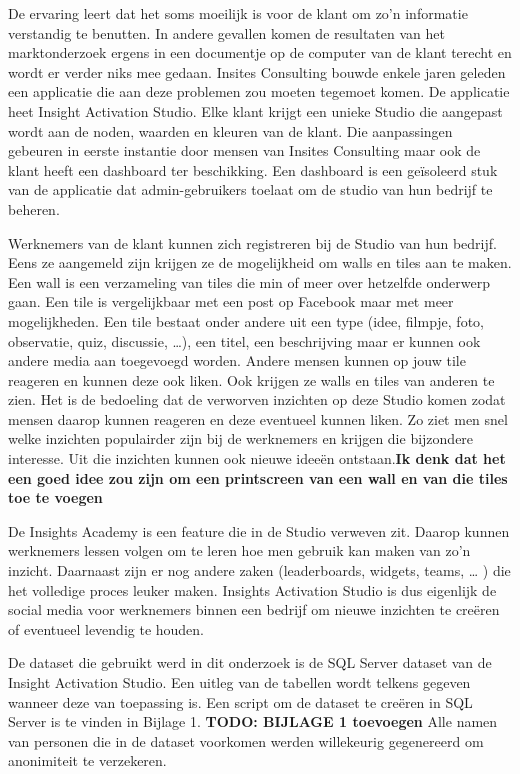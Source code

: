 De ervaring leert dat het soms moeilijk is voor de klant om zo'n informatie verstandig te benutten. In andere gevallen komen de resultaten van het marktonderzoek ergens in een documentje op de computer van de klant terecht en wordt er verder niks mee gedaan. Insites Consulting bouwde enkele jaren geleden een applicatie die aan deze problemen zou moeten tegemoet komen. De applicatie heet Insight Activation Studio. Elke klant krijgt een unieke Studio die aangepast wordt aan de noden, waarden en kleuren van de klant. Die aanpassingen gebeuren in eerste instantie door mensen van Insites Consulting maar ook de klant heeft een dashboard ter beschikking. Een dashboard is een geïsoleerd stuk van de applicatie dat admin-gebruikers toelaat om de studio van hun bedrijf te beheren.  

Werknemers van de klant kunnen zich registreren bij de Studio van hun bedrijf. Eens ze aangemeld zijn krijgen ze de mogelijkheid om walls en tiles aan te maken. Een wall is een verzameling van tiles die min of meer over hetzelfde onderwerp gaan. Een tile is vergelijkbaar met een post op Facebook maar met meer mogelijkheden. Een tile bestaat onder andere uit een type (idee, filmpje, foto, observatie, quiz, discussie, …), een titel, een beschrijving maar er kunnen ook andere media aan toegevoegd worden. Andere mensen kunnen op jouw tile reageren en kunnen deze ook liken. Ook krijgen ze walls en tiles van anderen te zien. Het is de bedoeling dat de verworven inzichten op deze Studio komen zodat mensen daarop kunnen reageren en deze eventueel kunnen liken. Zo ziet men snel welke inzichten populairder zijn bij de werknemers en krijgen die bijzondere interesse. Uit die inzichten kunnen ook nieuwe ideeën ontstaan.\textbf{Ik denk dat het een goed idee zou zijn om een printscreen van een wall en van die tiles toe te voegen}

De Insights Academy is een feature die in de Studio verweven zit. Daarop kunnen werknemers lessen volgen om te leren hoe men gebruik kan maken van zo’n inzicht. Daarnaast zijn er nog andere zaken (leaderboards, widgets, teams, … ) die het volledige proces leuker maken. Insights Activation Studio is dus eigenlijk de social media voor werknemers binnen een bedrijf om nieuwe inzichten te creëren of eventueel levendig te houden.

De dataset die gebruikt werd in dit onderzoek is de SQL Server dataset van de Insight Activation Studio. Een uitleg van de tabellen wordt telkens gegeven wanneer deze van toepassing is. Een script om de dataset te creëren in SQL Server is te vinden in Bijlage 1. \textbf{TODO: BIJLAGE 1 toevoegen} Alle namen van personen die in de dataset voorkomen werden willekeurig gegenereerd om anonimiteit te verzekeren.

